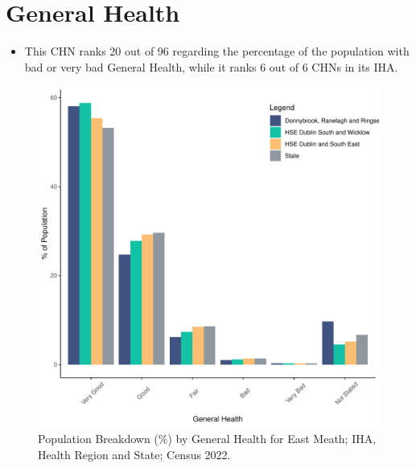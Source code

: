 \documentclass{article}
\begin{document}
\pagebreak

\section{General Health}\label{sect:GenHealth}
\begin{itemize}
\item  This CHN ranks  20 out of 96 regarding the percentage of the population with bad or very bad General Health, while it ranks   6 out of 6 CHNs in its IHA.
\end{itemize}
\begin{figure}[h]
	\centering
	\includegraphics[width = 150mm]{../figures/GenED.pdf}
	\caption{Population Breakdown (\%) by General Health for East Meath; IHA, Health Region and State;  Census 2022.}
	\label{fig:2ae19629-1a6a-13a3-e055-000000000001}
	\end{figure}
\end{document}
